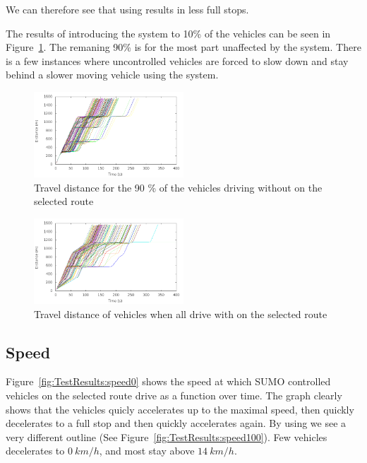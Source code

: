 We can therefore see that using \tech results in less full stops.

The results of introducing the system to 10\% of the vehicles can be seen in Figure~\ref{fig:TestResults:distanceUnC10}. 
The remaning 90\% is for the most part unaffected by the system. 
There is a few instances where uncontrolled vehicles are forced to slow down and stay behind a slower moving vehicle using the system.

\begin{figure}[H]
\includegraphics[width=0.5\textwidth]{../images/tp0c1_0/distanceUncontrolled10.png}
\caption{Travel distance for the 90 \% of the vehicles driving without \tech on the selected route}
\label{fig:TestResults:distanceUnC10}
\end{figure}

\begin{figure}[H]
\includegraphics[width=0.5\textwidth]{../images/tp0c1_0/distanceControlled100.png}
\caption{Travel distance of vehicles when all drive with \tech on the selected route}
\label{fig:TestResults:distance100}
\end{figure}

\subsection{Speed}
Figure~\ref{fig:TestResults:speed0} shows the speed at which SUMO controlled vehicles on the selected route drive as a function over time.
The graph clearly shows that the vehicles quicly accelerates up to the maximal speed, then quickly decelerates to a full stop and then quickly accelerates again.
By using \tech we see a very different outline (See Figure~\ref{fig:TestResults:speed100}).
Few vehicles decelerates to $0\ km/h$, and most stay above $14\ km/h$.


